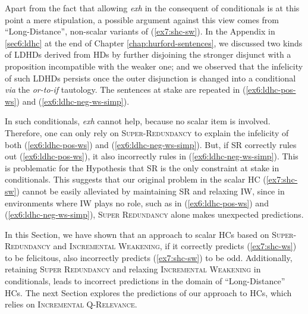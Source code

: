 Apart from the fact that allowing \textit{exh} in the consequent of conditionals is at this point a mere stipulation, a possible argument against this view comes from ``Long-Distance'', non-scalar variants of (\ref{ex7:shc-sw}). In the Appendix in \ref{sec6:ldhc} at the end of Chapter \ref{chap:hurford-sentences}, we discussed two kinds of LDHDs derived from HDs by further disjoining the stronger disjunct with a proposition incompatible with the weaker one; and we observed that the infelicity of such LDHDs persists once the outer disjunction is changed into a conditional \textit{via} the \textit{or-to-if} tautology. The sentences at stake are repeated in (\ref{ex6:ldhc-pos-ws}) and (\ref{ex6:ldhc-neg-ws-simp}).


\begin{exe}
\end{exe}

In such conditionals, \textit{exh} cannot help, because no scalar item is involved. Therefore, one can only rely on \textsc{Super-Redundancy} to explain the infelicity of both (\ref{ex6:ldhc-pos-ws}) and (\ref{ex6:ldhc-neg-ws-simp}). But, if SR correctly rules out (\ref{ex6:ldhc-pos-ws}), it also incorrectly rules in (\ref{ex6:ldhc-neg-ws-simp}). This is problematic for the Hypothesis that SR is the only constraint at stake in conditionals. This suggests that our original problem in the scalar HC (\ref{ex7:shc-sw}) cannot be easily alleviated by maintaining SR and relaxing IW, since in environments where IW plays no role, such as in (\ref{ex6:ldhc-pos-ws}) and (\ref{ex6:ldhc-neg-ws-simp}), \textsc{Super Redundancy} alone makes unexpected predictions.


In this Section, we have shown that an approach to scalar HCs based on \textsc{Super-Redundancy} and \textsc{Incremental Weakening}, if it correctly predicts  (\ref{ex7:shc-ws}) to be felicitous, also incorrectly predicts  (\ref{ex7:shc-sw}) to be odd. Additionally, retaining \textsc{Super Redundancy} and relaxing \textsc{Incremental Weakening} in conditionals, leads to incorrect predictions in the domain of 	``Long-Distance'' HCs. The next Section explores the predictions of our approach to HCs, which relies on \textsc{Incremental Q-Relevance}.

